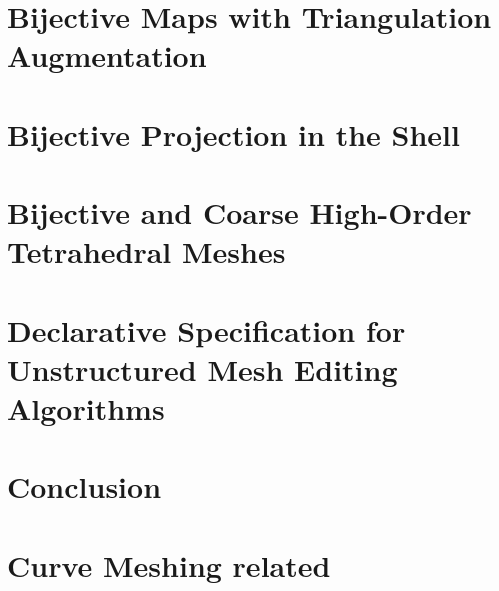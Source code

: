 \documentclass[12pt,oneside,letterpaper, draft]{report}
\begin{document}
\chapter{Bijective Maps with Triangulation Augmentation}
\label{chp:scaf}

% 
% 
% 
% 


\chapter{Bijective Projection in the Shell}
\label{chp:shell}

% 
% 
% 
% 

\chapter{Bijective and Coarse High-Order Tetrahedral Meshes}
\label{chp:curve}
% 
% 
% 
% 
% 

\chapter{Declarative Specification for Unstructured Mesh Editing Algorithms }
\label{chp:wmtk}

% 
% 
% 
% 

\chapter{Conclusion}
\label{chp-conclusion}



\appendix


\chapter{Curve Meshing related}






\cleardoublepage
{}



\end{document}
